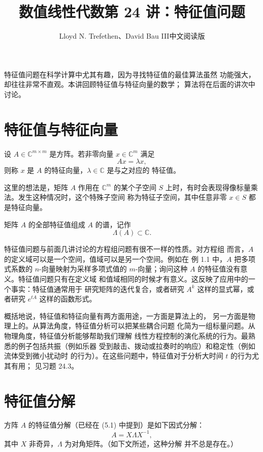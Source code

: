 \documentclass[UTF8,fontset=none,12pt]{ctexart}
\title{数值线性代数\quad 第 24 讲：特征值问题}
\author{Lloyd N. Trefethen、David Bau III\quad 中文阅读版}
\date{}
\begin{document}
\maketitle
\pagestyle{plain}

特征值问题在科学计算中尤其有趣，因为寻找特征值的最佳算法虽然
功能强大，却往往非常不直观。本讲回顾特征值与特征向量的数学；
算法将在后面的讲次中讨论。

\section*{特征值与特征向量}

设 $A\in\mathbb{C}^{m\times m}$ 是方阵。若非零向量
$x\in\mathbb{C}^m$ 满足
\begin{equation}
Ax=\lambda x,
\tag{24.1}
\end{equation}
则称 $x$ 是 $A$ 的特征向量，$\lambda\in\mathbb{C}$ 是与之对应的
特征值。

这里的想法是，矩阵 $A$ 作用在 $\mathbb{C}^m$ 的某个子空间 $S$
上时，有时会表现得像标量乘法。发生这种情况时，这个特殊子空间
称为特征子空间，其中任意非零 $x\in S$ 都是特征向量。

矩阵 $A$ 的全部特征值组成 $A$ 的谱，记作
\[
\Lambda(A)\subset\mathbb{C}.
\]

特征值问题与前面几讲讨论的方程组问题有很不一样的性质。对方程组
而言，$A$ 的定义域可以是一个空间，值域可以是另一个空间。例如在
例 1.1 中，$A$ 把多项式系数的 $n$-向量映射为采样多项式值的
$m$-向量；询问这种 $A$ 的特征值没有意义。特征值问题只有在定义域
和值域相同的时候才有意义。这反映了应用中的一个事实：特征值通常用于
研究矩阵的迭代复合，或者研究 $A^k$ 这样的显式幂，或者研究
$e^{tA}$ 这样的函数形式。

概括地说，特征值和特征向量有两方面用途，一方面是算法上的，
另一方面是物理上的。从算法角度，特征值分析可以把某些耦合问题
化简为一组标量问题。从物理角度，特征值分析能够帮助我们理解
线性方程控制的演化系统的行为。最熟悉的例子包括共振（例如乐器
受到敲击、拨动或拉奏时的响应）和稳定性（例如流体受到微小扰动时
的行为）。在这些问题中，特征值对于分析大时间 $t$ 的行为尤其有用；
见习题 24.3。

\section*{特征值分解}

方阵 $A$ 的特征值分解（已经在 (5.1) 中提到）是如下因式分解：
\begin{equation}
A=X\Lambda X^{-1},
\tag{24.2}
\end{equation}
其中 $X$ 非奇异，$\Lambda$ 为对角矩阵。（如下文所述，这种分解
并不总是存在。）
\end{document}
